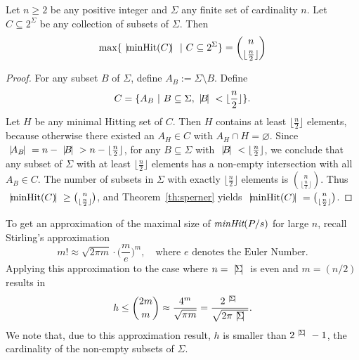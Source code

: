 \begin{theorem}
\label{th:upperboundh}
Let $n\ge 2$ be any positive integer and $\Sigma$  any finite set of cardinality $n$.
Let $C\subseteq 2^\Sigma$ be any collection of  subsets of $\Sigma$. Then  
\[
\text{max}\{{~|\! \text{minHit}(C)\!|~}~|~C\subseteq 2^\Sigma\}=\binom{n}{\lfloor\frac{n}{2}\rfloor}
\]
\end{theorem}
\begin{proof}
For any subset  $B$  of $\Sigma$, define  $A_{B}:=\Sigma\setminus B$.
Define 
$$
C=\{A_{B}~|~ B\subseteq \Sigma, {~|\! B\!|~} < \lfloor\frac{n}{2}\rfloor\}.
$$
Let $H$ be any minimal Hitting set of $C$. Then $H$ contains at least $\lfloor\frac{n}{2}\rfloor$ elements, because 
otherwise there existed an $A_{H}\in C$ with $A_H\cap H=\varnothing$. 
Since ${~|\! A_{B}\!|~}=n-{~|\! B\!|~}>n-\lfloor\frac{n}{2}\rfloor$, for any $B\subseteq \Sigma$ with ${~|\! B\!|~}< \lfloor\frac{n}{2}\rfloor$, we conclude that
 any  subset of $\Sigma$  with at least $\lfloor\frac{n}{2}\rfloor$ elements 
 has a non-empty intersection with all  $A_B\in C$.  
 The number of subsets in $\Sigma$ with exactly $\lfloor \frac{n}{2}\rfloor$ elements
 is $\binom{n}{\lfloor\frac{n}{2}\rfloor}$.
Thus ${~|\! \text{minHit}(C)\!|~} \ge \binom{n}{\lfloor\frac{n}{2}\rfloor}$, and 
Theorem~\ref{th:sperner} yields ${~|\! \text{minHit}(C)\!|~} = \binom{n}{\lfloor\frac{n}{2}\rfloor}$.
\xbox
\end{proof}


To get an approximation of the maximal size of $\text{\it minHit}(P/s)$ for large $n$, recall
Stirling's approximation~\cite[p.~112]{Graham:1994:CMF:562056}
\[
m! \approx \sqrt{2\pi m} \cdot \big( \frac{m}{e} \big)^m, \quad\text{where $e$ denotes the Euler Number.}
\]
Applying this approximation to the   case where $n = {~|\! \Sigma\!|~}$ is even and $m = (n/2)$  
results in
\[
h \le \binom{2m}{m} \approx \frac{4^m}{\sqrt{\pi m}} = 
\frac{2^{~|\! \Sigma\!|~}}{\sqrt{2\pi {~|\! \Sigma\!|~}}}.
\]
%
We note that, due to this approximation result, 
$h$ is   smaller than $2^{{~|\! \Sigma\!|~}}-1$, the cardinality of the 
non-empty subsets of $\Sigma$.

